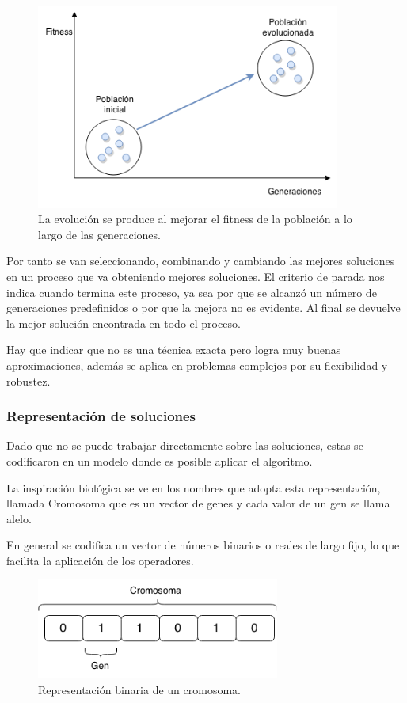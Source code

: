 \begin{figure}[H]
	\centering
	\includegraphics[width=10cm]{Figures/fitness_generaciones}
	\caption{La evolución se produce al mejorar el fitness de la población a lo largo de las generaciones.}
	\label{fig:fitness_generaciones}
\end{figure}

Por tanto se van seleccionando, combinando y cambiando las mejores soluciones en un proceso que va obteniendo mejores soluciones.
El criterio de parada nos indica cuando termina este proceso, ya sea por que se alcanzó un número de generaciones predefinidos o por que la mejora no es evidente. Al final se devuelve la mejor solución encontrada en todo el proceso.

Hay que indicar que no es una técnica exacta pero logra muy buenas aproximaciones, además se aplica en problemas complejos por su flexibilidad y robustez. 

\subsubsection{Representación de soluciones}
Dado que no se puede trabajar directamente sobre las soluciones, estas se codificaron en un modelo donde es posible aplicar el algoritmo.

La inspiración biológica se ve en los nombres que adopta esta representación, llamada Cromosoma que es un vector de genes y cada valor de un gen se llama alelo.

En general se codifica un vector de números binarios o reales de largo fijo, lo que facilita la aplicación de los operadores.

\begin{figure}[H]
	\centering
	\includegraphics[width=8cm]{Figures/rep_binaria}
	\caption{Representación binaria de un cromosoma.}
	\label{fig:rep_binaria}
\end{figure}


